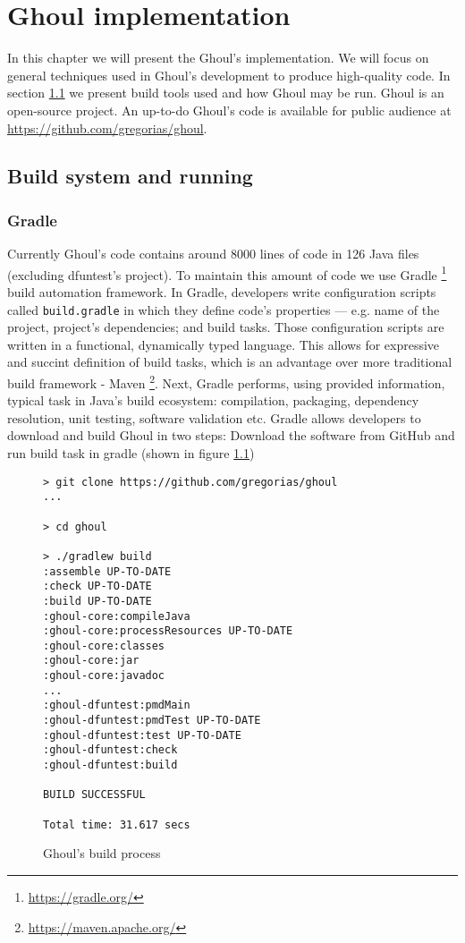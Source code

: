 \chapter{Ghoul implementation}
In this chapter we will present the Ghoul's implementation.
We will focus on general techniques used in Ghoul's development to produce high-quality code.
In section \ref{sec:build} we present build tools used and how Ghoul may be run.
Ghoul is an open-source project.
An up-to-do Ghoul's code is available for public audience at \url{https://github.com/gregorias/ghoul}.

\section{Build system and running}
\label{sec:build}

\subsection{Gradle}
Currently Ghoul's code contains around 8000 lines of code in 126 Java files (excluding dfuntest's project).
To maintain this amount of code we use Gradle \footnote{\url{https://gradle.org/}} build automation framework.
In Gradle, developers write configuration scripts called \texttt{build.gradle} in which they define code's properties --- e.g. name of the project, project's dependencies; and build tasks.
Those configuration scripts are written in a functional, dynamically typed language.
This allows for expressive and succint definition of build tasks, which is an
advantage over more traditional build framework - Maven \footnote{\url{https://maven.apache.org/}}.
Next, Gradle performs, using provided information, typical task in Java's build ecosystem: compilation, packaging, dependency resolution, unit testing, software validation etc.
Gradle allows developers to download and build Ghoul in two steps: Download the software from GitHub and run build task in gradle (shown in figure \ref{fig:ghoul_build_process})

\begin{figure}[tb]
\begin{verbatim}
> git clone https://github.com/gregorias/ghoul
...

> cd ghoul

> ./gradlew build
:assemble UP-TO-DATE
:check UP-TO-DATE
:build UP-TO-DATE
:ghoul-core:compileJava
:ghoul-core:processResources UP-TO-DATE
:ghoul-core:classes
:ghoul-core:jar
:ghoul-core:javadoc
...
:ghoul-dfuntest:pmdMain
:ghoul-dfuntest:pmdTest UP-TO-DATE
:ghoul-dfuntest:test UP-TO-DATE
:ghoul-dfuntest:check
:ghoul-dfuntest:build

BUILD SUCCESSFUL

Total time: 31.617 secs
\end{verbatim}
\caption{Ghoul's build process}
\label{fig:ghoul_build_process}
\end{figure}

